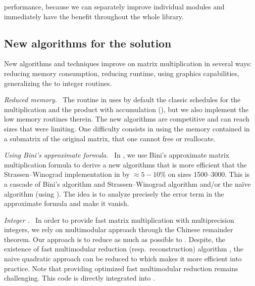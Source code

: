 performance, because we can separately improve individual modules and
immediately have the benefit throughout the whole library.
%
\subsection{New algorithms for the \mul solution}\label{ssec:algmul}
%
New algorithms and techniques improve on matrix multiplication
in several  ways: reducing memory consumption, reducing runtime,
using graphics capabilities, generalizing the \blas to integer
routines.
%
\def\monitem#1{\par \textit{#1}\ }
\monitem{Reduced memory.}
%
The routine \fgemm in \fflas uses by default the classic schedules for the multiplication
and the product with accumulation (\cf \cite{Boyer:2009:sched}), but we also
implement the low memory routines therein. The new algorithms are competitive
and can reach sizes that were limiting.
%
%
One difficulty consists in using the memory contained in a submatrix of
the original matrix, that one cannot free or reallocate.
%
\monitem{Using Bini's approximate formula.}
%
In \cite{BD:2014:Bini}, we use Bini's approximate matrix multiplication formula
to derive a new algorithms that is more efficient that the Strassen--Winograd
implementation in \fgemm by $\approx 5-10\%$ on sizes \num{1500}--\num{3000}.
This is a cascade of Bini's algorithm and Strassen--Winograd algorithm and/or
the naïve algorithm (using \blas). The idea is to analyze precisely the error
term in the approximate formula and make it vanish.
%
\monitem{Integer \blas.}
%
In order to provide fast matrix multiplication with multiprecision integers, we
rely on multimodular approach through the Chinese remainder theorem. Our
approach is to reduce as much as possible to \fgemm. Despite, the existence of
fast multimodular reduction (resp.\ reconstruction) algorithm
\cite{VonzurGathen:1999:MCA}, the naive quadratic approach can be reduced to
\fgemm which makes it more efficient into practice.  Note that providing
optimized fast multimodular reduction remains challenging. This code is
directly integrated  into \fflas.

